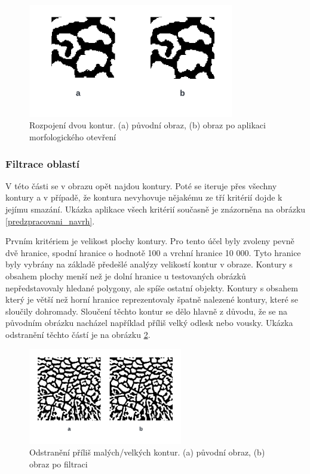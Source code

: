 \begin{figure}[h]
	\centering
	\includegraphics[width=0.8\textwidth]{obrazky/otevreni.png}
	\caption{Rozpojení dvou kontur. (a) původní obraz, (b) obraz po aplikaci morfologického otevření}
	\label{rozpojeni}
\end{figure} 

\subsubsection{Filtrace oblastí}
V této části se v obrazu opět najdou kontury. Poté se iteruje přes všechny kontury a v případě, že kontura nevyhovuje nějakému ze tří kritérií dojde k jejímu smazání. Ukázka aplikace všech kritérií současně je znázorněna na obrázku \ref{predzpracovani_navrh}.

 Prvním kritériem je velikost plochy kontury. Pro tento účel byly zvoleny pevně dvě hranice, spodní hranice o hodnotě 100 a vrchní hranice 10 000. Tyto hranice byly vybrány na základě předešlé analýzy velikostí kontur v obraze. Kontury s obsahem plochy menší než je dolní hranice u testovaných obrázků nepředstavovaly hledané polygony, ale spíše ostatní objekty. Kontury s obsahem který je větší než horní hranice reprezentovaly špatně nalezené kontury, které se sloučily dohromady. Sloučení těchto kontur se dělo hlavně z důvodu, že se na původním obrázku nacházel například příliš velký odlesk nebo vousky. Ukázka odstranění těchto částí je na obrázku \ref{filter1}.

\begin{figure}[h]
	\centering
	\includegraphics[width=0.6\textwidth]{obrazky/filter1.png}
	\caption{Odstranění příliš malých/velkých kontur. (a) původní obraz, (b) obraz po filtraci}
	\label{filter1}
\end{figure} 

